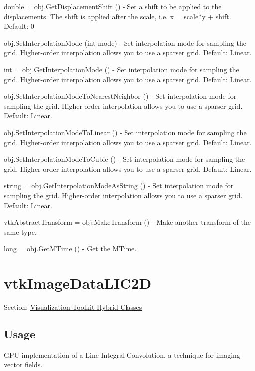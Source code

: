 \begin{DoxyItemize}
\item {\ttfamily double = obj.\-Get\-Displacement\-Shift ()} -\/ Set a shift to be applied to the displacements. The shift is applied after the scale, i.\-e. x = scale$\ast$y + shift. Default\-: 0  
\item {\ttfamily obj.\-Set\-Interpolation\-Mode (int mode)} -\/ Set interpolation mode for sampling the grid. Higher-\/order interpolation allows you to use a sparser grid. Default\-: Linear.  
\item {\ttfamily int = obj.\-Get\-Interpolation\-Mode ()} -\/ Set interpolation mode for sampling the grid. Higher-\/order interpolation allows you to use a sparser grid. Default\-: Linear.  
\item {\ttfamily obj.\-Set\-Interpolation\-Mode\-To\-Nearest\-Neighbor ()} -\/ Set interpolation mode for sampling the grid. Higher-\/order interpolation allows you to use a sparser grid. Default\-: Linear.  
\item {\ttfamily obj.\-Set\-Interpolation\-Mode\-To\-Linear ()} -\/ Set interpolation mode for sampling the grid. Higher-\/order interpolation allows you to use a sparser grid. Default\-: Linear.  
\item {\ttfamily obj.\-Set\-Interpolation\-Mode\-To\-Cubic ()} -\/ Set interpolation mode for sampling the grid. Higher-\/order interpolation allows you to use a sparser grid. Default\-: Linear.  
\item {\ttfamily string = obj.\-Get\-Interpolation\-Mode\-As\-String ()} -\/ Set interpolation mode for sampling the grid. Higher-\/order interpolation allows you to use a sparser grid. Default\-: Linear.  
\item {\ttfamily vtk\-Abstract\-Transform = obj.\-Make\-Transform ()} -\/ Make another transform of the same type.  
\item {\ttfamily long = obj.\-Get\-M\-Time ()} -\/ Get the M\-Time.  
\end{DoxyItemize}\hypertarget{vtkhybrid_vtkimagedatalic2d}{}\section{vtk\-Image\-Data\-L\-I\-C2\-D}\label{vtkhybrid_vtkimagedatalic2d}
Section\-: \hyperlink{sec_vtkhybrid}{Visualization Toolkit Hybrid Classes} \hypertarget{vtkwidgets_vtkxyplotwidget_Usage}{}\subsection{Usage}\label{vtkwidgets_vtkxyplotwidget_Usage}
G\-P\-U implementation of a Line Integral Convolution, a technique for imaging vector fields.

